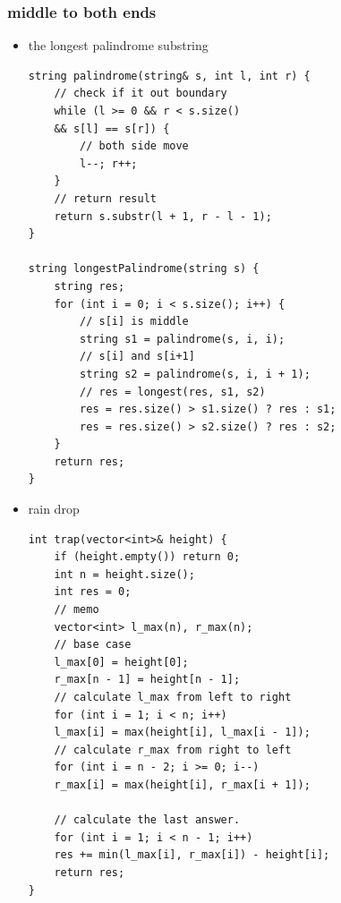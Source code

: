 \documentclass[a4paper,11pt,twoside]{book}
\begin{document}
\subsubsection{middle to both ends}
\begin{itemize}
	\item the longest palindrome substring
	
\begin{lstlisting}[breaklines]
string palindrome(string& s, int l, int r) {
	// check if it out boundary
	while (l >= 0 && r < s.size()
	&& s[l] == s[r]) {
		// both side move
		l--; r++;
	}
	// return result
	return s.substr(l + 1, r - l - 1);
}

string longestPalindrome(string s) {
	string res;
	for (int i = 0; i < s.size(); i++) {
		// s[i] is middle
		string s1 = palindrome(s, i, i);
		// s[i] and s[i+1] 
		string s2 = palindrome(s, i, i + 1);
		// res = longest(res, s1, s2)
		res = res.size() > s1.size() ? res : s1;
		res = res.size() > s2.size() ? res : s2;
	}
	return res;
}
\end{lstlisting}
	
	\item rain drop
	
\begin{lstlisting}[breaklines]
int trap(vector<int>& height) {
	if (height.empty()) return 0;
	int n = height.size();
	int res = 0;
	// memo
	vector<int> l_max(n), r_max(n);
	// base case
	l_max[0] = height[0];
	r_max[n - 1] = height[n - 1];
	// calculate l_max from left to right
	for (int i = 1; i < n; i++)
	l_max[i] = max(height[i], l_max[i - 1]);
	// calculate r_max from right to left
	for (int i = n - 2; i >= 0; i--) 
	r_max[i] = max(height[i], r_max[i + 1]);
	
	// calculate the last answer.
	for (int i = 1; i < n - 1; i++) 
	res += min(l_max[i], r_max[i]) - height[i];
	return res;
}
\end{lstlisting}

\end{itemize}
\end{document}

